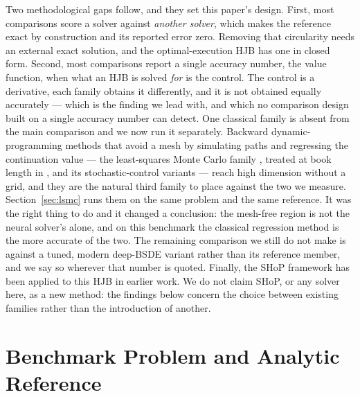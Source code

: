 \documentclass[conference]{IEEEtran}
\begin{document}
Two methodological gaps follow, and they set this paper's design. First, most comparisons score a
solver against \emph{another solver}, which makes the reference exact by construction and its
reported error zero. Removing that circularity needs an external exact solution, and the
optimal-execution HJB has one in closed form. Second, most comparisons report a single accuracy
number, the value function, when what an HJB is solved \emph{for} is the control. The control is a
derivative, each family obtains it differently, and it is not obtained equally accurately --- which
is the finding we lead with, and which no comparison design built on a single accuracy number can
detect. One classical family is absent from the main comparison and we now run it separately.
Backward dynamic-programming methods that avoid a mesh by simulating paths and regressing the
continuation value --- the least-squares Monte Carlo family \cite{longstaff2001valuing}, treated at
book length in \cite{glaserman2003monte}, and its stochastic-control variants
\cite{kharroubi2014numerical,bender2012least} --- reach high dimension without a grid, and they are
the natural third family to place against the two we measure. Section~\ref{sec:lsmc} runs them on the
same problem and the same reference. It was the right thing to do and it changed a conclusion: the
mesh-free region is not the neural solver's alone, and on this benchmark the classical regression
method is the more accurate of the two. The remaining comparison we still do not make is against a
tuned, modern deep-BSDE variant rather than its reference member, and we say so wherever that number
is quoted.
Finally, the SHoP framework \cite{xiao2024shop} has been applied to this HJB in earlier work. We do
not claim SHoP, or any solver here, as a new method: the findings below concern the choice between
existing families rather than the introduction of another.

\section{Benchmark Problem and Analytic Reference}\label{sec:bench}
\end{document}
